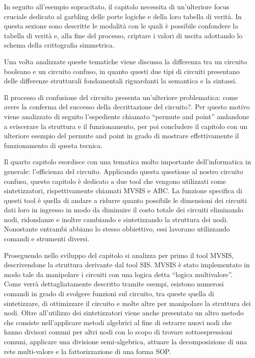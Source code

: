\documentclass[
]{book}
\begin{document}
In seguito all'esempio sopracitato, il capitolo necessita di un'ulteriore focus cruciale dedicato al garbling delle porte logiche e della loro tabella di verità. In questa sezione sono descritte le modalità con le quali è possibile confondere la tabella di verità e, alla fine del processo, criptare i valori di uscita adottando lo schema della crittografia simmetrica.

Una volta analizzate queste tematiche viene discussa la differenza tra un circuito booleano e un circuito confuso, in quanto questi due tipi di circuiti presentano delle differenze strutturali fondamentali riguardanti la semantica e la sintassi.

Il processo di confusione del circuito presenta un'ulteriore problematica: come avere la conferma del successo della decrittazione del circuito?. Per questo motivo viene analizzato di seguito l'espediente chiamato ``permute and point'' andandone a sviscerare la struttura e il funzionamento, per poi concludere il capitolo con un ulteriore esempio del permute and point in grado di mostrare effettivamente il funzionamento di questa tecnica.

\newpage

Il quarto capitolo esordisce con una tematica molto importante dell'informatica in generale: l'efficienza del circuito. Applicando questa questione al nostro circuito confuso, questo capitolo è dedicato a due tool che vengono utilizzati come sintetizzatori, rispettivamente chiamati MVSIS e ABC. La funzione specifica di questi tool è quella di andare a ridurre quanto possibile le dimensioni dei circuiti dati loro in ingresso in modo da diminuire il costo totale dei circuiti eliminando nodi, ridondanze e inoltre cambiando e sintetizzando la struttura dei nodi. Nonostante entrambi abbiano lo stesso obbiettivo, essi lavorano utilizzando comandi e strumenti diversi.

Proseguendo nello sviluppo del capitolo si analizza per primo il tool MVSIS, descrivendone la struttura derivante dal tool SIS. MVSIS è stato implementato in modo tale da manipolare i circuiti con una logica detta ``logica multivalore''. Come verrà dettagliatamente descritto tramite esempi, esistono numerosi comandi in grado di svolgere funzioni sul circuito, tra queste quella di sintetizzare, di ottimizzare il circuito e molte altre per manipolare la struttura dei nodi. Oltre all'utilizzo dei sintetizzatori viene anche presentato un altro metodo che consiste nell'applicare metodi algebrici al fine di estrarre nuovi nodi che hanno divisori comuni per altri nodi con lo scopo di trovare sottoespressioni comuni, applicare una divisione semi-algebrica, attuare la decomposizione di una rete multi-valore e la fattorizzazione di una forma SOP.
\end{document}
